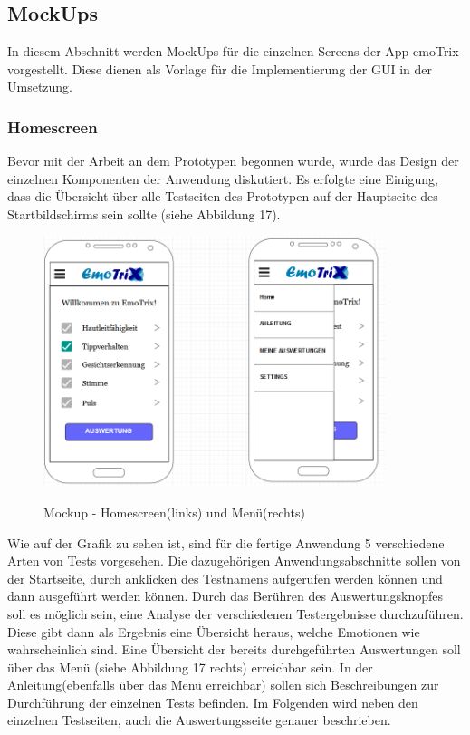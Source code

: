 \subsection{MockUps}
In diesem Abschnitt werden MockUps für die einzelnen Screens der App emoTrix vorgestellt. Diese dienen als Vorlage für die Implementierung der GUI in der Umsetzung.
\subsubsection{Homescreen}
Bevor mit der Arbeit an dem Prototypen begonnen wurde, wurde  das Design der einzelnen Komponenten der Anwendung diskutiert. Es erfolgte eine Einigung, dass die Übersicht über alle Testseiten des Prototypen auf der Hauptseite des Startbildschirms sein sollte (siehe Abbildung 17).
\begin{figure}[h]
	\centering
	\includegraphics[width=10cm]{Bilder/Mockup-Home.png}
	\label{img:Mockup-Home}
	\caption[Mockup - Homescreen(links) und Menü(rechts)]{Mockup - Homescreen(links) und Menü(rechts)}
\end{figure}%
Wie auf der Grafik zu sehen ist, sind für die fertige Anwendung 5 verschiedene Arten von Tests vorgesehen. Die dazugehörigen Anwendungsabschnitte sollen von der Startseite, durch anklicken des Testnamens aufgerufen werden können und dann ausgeführt werden können. Durch das Berühren des Auswertungsknopfes soll es möglich sein, eine Analyse der verschiedenen Testergebnisse durchzuführen. Diese gibt dann als Ergebnis eine Übersicht heraus, welche Emotionen wie wahrscheinlich sind. Eine Übersicht der bereits durchgeführten Auswertungen soll über das Menü (siehe Abbildung 17 rechts) erreichbar sein. In der Anleitung(ebenfalls über das Menü erreichbar) sollen sich Beschreibungen zur Durchführung der einzelnen Tests befinden.\newline
Im Folgenden wird neben den einzelnen Testseiten, auch die Auswertungsseite genauer beschrieben.  \newline
